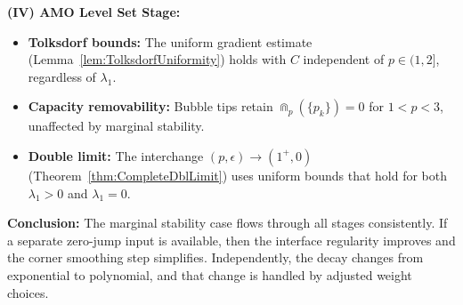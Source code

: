 \begin{remark}[Marginal Stability Consistency Verification: $\lambda_1 = 0$ Throughout Pipeline]
\textbf{(IV) AMO Level Set Stage:}
\begin{itemize}
    \item \textbf{Tolksdorf bounds:} The uniform gradient estimate (Lemma~\ref{lem:TolksdorfUniformity}) holds with $C$ independent of $p \in (1,2]$, regardless of $\lambda_1$.
    \item \textbf{Capacity removability:} Bubble tips retain $\Cap_p(\{p_k\}) = 0$ for $1 < p < 3$, unaffected by marginal stability.
    \item \textbf{Double limit:} The interchange $(p, \epsilon) \to (1^+, 0)$ (Theorem~\ref{thm:CompleteDblLimit}) uses uniform bounds that hold for both $\lambda_1 > 0$ and $\lambda_1 = 0$.
\end{itemize}

\textbf{Conclusion:} The marginal stability case flows through all stages consistently. If a separate zero-jump input is available, then the interface regularity improves and the corner smoothing step simplifies. Independently, the decay changes from exponential to polynomial, and that change is handled by adjusted weight choices.
\end{remark}
